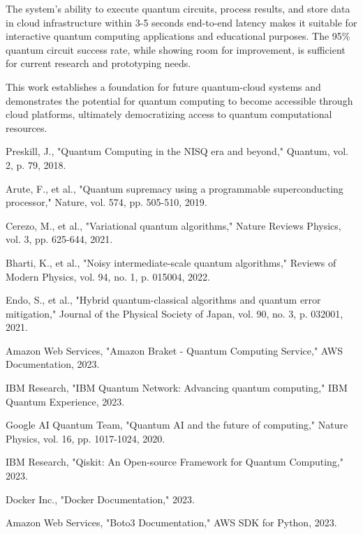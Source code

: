 \documentclass[onecolumn]{IEEEtran}
\begin{document}
The system's ability to execute quantum circuits, process results, and store data in cloud infrastructure within 3-5 seconds end-to-end latency makes it suitable for interactive quantum computing applications and educational purposes. The 95\% quantum circuit success rate, while showing room for improvement, is sufficient for current research and prototyping needs.

This work establishes a foundation for future quantum-cloud systems and demonstrates the potential for quantum computing to become accessible through cloud platforms, ultimately democratizing access to quantum computational resources.



\begin{thebibliography}{15}

Preskill, J., "Quantum Computing in the NISQ era and beyond," Quantum, vol. 2, p. 79, 2018.

Arute, F., et al., "Quantum supremacy using a programmable superconducting processor," Nature, vol. 574, pp. 505-510, 2019.

Cerezo, M., et al., "Variational quantum algorithms," Nature Reviews Physics, vol. 3, pp. 625-644, 2021.

Bharti, K., et al., "Noisy intermediate-scale quantum algorithms," Reviews of Modern Physics, vol. 94, no. 1, p. 015004, 2022.

Endo, S., et al., "Hybrid quantum-classical algorithms and quantum error mitigation," Journal of the Physical Society of Japan, vol. 90, no. 3, p. 032001, 2021.

Amazon Web Services, "Amazon Braket - Quantum Computing Service," AWS Documentation, 2023.

IBM Research, "IBM Quantum Network: Advancing quantum computing," IBM Quantum Experience, 2023.

Google AI Quantum Team, "Quantum AI and the future of computing," Nature Physics, vol. 16, pp. 1017-1024, 2020.

IBM Research, "Qiskit: An Open-source Framework for Quantum Computing," 2023.

Docker Inc., "Docker Documentation," 2023.

Amazon Web Services, "Boto3 Documentation," AWS SDK for Python, 2023.


\end{thebibliography}
\end{document}
